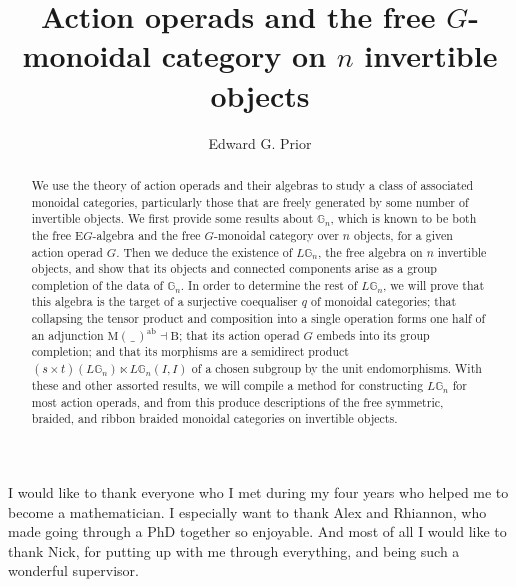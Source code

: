 \documentclass[a4paper,12pt,times,numbered,print,index]{Style/PhDThesisPSnPDF}
\title{Action operads and the free $G$-monoidal category on $n$ invertible objects}
\author{Edward G. Prior}
\numberwithin{equation}{section}
\theoremstyle{example}
\theoremstyle{named}
\begin{document}
 
 

\frontmatter

\maketitle  


\begin{acknowledgements}    
I would like to thank everyone who I met during my four years who helped me to become a mathematician. I especially want to thank Alex and Rhiannon, who made going through a PhD together so enjoyable. And most of all I would like to thank Nick, for putting up with me through everything, and being such a wonderful supervisor. 
\end{acknowledgements}

\begin{abstract}
We use the theory of action operads and their algebras to study a class of associated monoidal categories, particularly those that are freely generated by some number of invertible objects. We first provide some results about $\mathbb{G}_n$, which is known to be both the free $\mathrm{E}G$-algebra and the free $G$-monoidal category over $n$ objects, for a given action operad $G$. Then we deduce the existence of $L\mathbb{G}_n$, the free algebra on $n$ invertible objects, and show that its objects and connected components arise as a group completion of the data of $\mathbb{G}_n$. In order to determine the rest of $L\mathbb{G}_n$, we will prove that this algebra is the target of a surjective coequaliser $q$ of monoidal categories; that collapsing the tensor product and composition into a single operation forms one half of an adjunction $\mathrm{M}( \, \_ \, )^{\mathrm{ab}} \dashv \mathrm{B}$; that its action operad $G$ embeds into its group completion; and that its morphisms are a semidirect product $(s \times t)(L\mathbb{G}_n) \ltimes L\mathbb{G}_n(I,I)$ of a chosen subgroup by the unit endomorphisms. With these and other assorted results, we will compile a method for constructing $L\mathbb{G}_n$ for most action operads, and from this produce descriptions of the free symmetric, braided, and ribbon braided monoidal categories on invertible objects.
\end{abstract}

\tableofcontents


\end{document}
